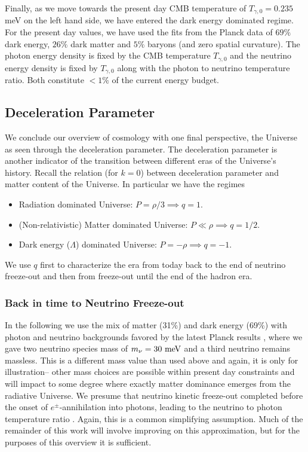 Finally, as we move towards the present day CMB temperature of $T_{\gamma,0}=0.235$ meV on the left hand side, we have entered the dark energy dominated regime.  For the present day values, we have used the fits from the Planck data \cite{Planck} of  $69\%$ dark energy, $26\%$ dark matter and $5\%$ baryons (and zero spatial curvature).  The photon energy density is fixed by the CMB temperature $T_{\gamma,0}$ and the neutrino energy density is fixed by $T_{\gamma,0}$ along with the photon to neutrino temperature ratio.  Both constitute $<1\%$ of the current energy budget.


\subsection{Deceleration Parameter}
We conclude our overview of cosmology with one final perspective, the Universe as seen through the deceleration parameter.  The deceleration parameter is another indicator of the transition between different eras of the Universe's history.  Recall the relation  (for $k=0$)  between deceleration parameter and matter content of the Universe. In particular we have the regimes

\begin{itemize}
\item Radiation dominated Universe: $P=\rho/3 \implies q=1$.\\


\item  (Non-relativistic) Matter dominated Universe: $P\ll\rho \implies q=1/2$.\\



\item Dark energy ($\Lambda$) dominated Universe: $P=-\rho \implies q=-1$.\\

\end{itemize}
We use $q$ first to characterize the era from today back to the end of neutrino freeze-out and then from freeze-out until the end of the hadron era.


\subsubsection{Back in time to Neutrino Freeze-out}\label{recomb}
In the following we use the mix of matter  (31\%) and dark energy (69\%) with photon and neutrino backgrounds favored by the latest Planck results \cite{Planck}, where we gave two neutrino species mass of $m_\nu=30\text{ meV}$ and a third neutrino remains  massless.  This is a different mass value than used above and again, it is only for illustration-- other mass choices are possible within present day constraints and will impact to some degree where exactly matter dominance emerges from the radiative Universe.  We presume  that neutrino kinetic freeze-out completed before the onset of $e^\pm$-annihilation into  photons, leading to the neutrino to photon temperature ratio . Again, this is a common simplifying assumption.  Much of the remainder of this work will involve improving on this approximation, but for the purposes of this overview it is sufficient.

